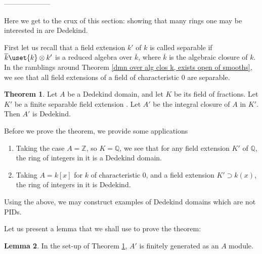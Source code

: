 \documentclass[12 pt]{article}
\theoremstyle{definition}
\newtheorem{theorem}{Theorem}[section]
\newtheorem{lemma}[theorem]{Lemma}
\newcommand\qq{\mathbb{Q}}
\newcommand\zz{\mathbb{Z}}
\begin{document}
\centerline{--------------------}

Here we get to the crux of this section: showing that many rings one may be interested in are Dedekind. 

First let us recall that a field extension $k'$ of $k$ is called separable if $\overline{k} \uset{k}\otimes k'$ is a reduced algebra over $\overline{k}$, where $\overline{k}$ is the algebraic closure of $k$. In the ramblings around Theorem \ref{dmn over alg clos k, exists open of smooths}, we see that all field extensions of a field of characteristic 0 are separable.

\begin{theorem} Let $A$ be a Dedekind domain, and let $K$ be its field of fractions. Let $K'$ be a finite separable field extension . Let $A'$ be the integral closure of $A$ in $K'$. Then $A'$ is Dedekind.
\label{ring of ints in field ext of Dedek is Dedek}
\end{theorem}

Before we prove the theorem, we provide some applications

\begin{enumerate}
\item Taking the case $A=\zz$, so $K=\qq$, we see that for any field extension $K'$ of $\qq$, the ring of integers in it is a Dedekind domain.

\item Taking $A=k[x]$ for $k$ of characteristic 0, and a field extension $K' \supset k(x)$, the ring of integers in it is Dedekind.
\end{enumerate}

Using the above, we may construct examples of Dedekind domains which are not PIDs.


Let us present a lemma that we shall use to prove the theorem:
\begin{lemma} In the set-up of Theorem \ref{ring of ints in field ext of Dedek is Dedek}, $A'$ is finitely generated as an $A$ module.
\end{lemma}
\end{document}
